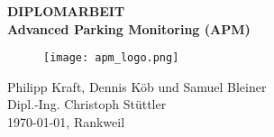 
\begin{center}
  \vspace*{1cm}
  \huge{\textbf{DIPLOMARBEIT}}\\[2mm]
  \large{\textbf{Advanced Parking Monitoring (APM)}}\\[5mm]
  \begin{figure}[h] %
    \centering
    \texttt{[image: apm\_logo.png]}
  \end{figure}
  \vspace{5mm}
  Philipp Kraft, Dennis Köb und Samuel Bleiner\\[2mm]
  Dipl.-Ing. Christoph Stüttler \\[5mm]
  \today, Rankweil
  \vfill
\end{center}


